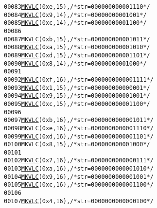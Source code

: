 \begin{footnotesize}
\begin{alltt}
00083         \hyperlink{vlc_8h_aa680b26539d09b5954221ff39a127faa}{MKVLC}( 0xe, 15 ), \textcolor{comment}{/* str=000000000001110 */}
00084         \hyperlink{vlc_8h_aa680b26539d09b5954221ff39a127faa}{MKVLC}( 0x9, 14 ), \textcolor{comment}{/* str=00000000001001 */}
00085         \hyperlink{vlc_8h_aa680b26539d09b5954221ff39a127faa}{MKVLC}( 0xc, 14 ), \textcolor{comment}{/* str=00000000001100 */}
00086 
00087         \hyperlink{vlc_8h_aa680b26539d09b5954221ff39a127faa}{MKVLC}( 0xb, 15 ), \textcolor{comment}{/* str=000000000001011 */}
00088         \hyperlink{vlc_8h_aa680b26539d09b5954221ff39a127faa}{MKVLC}( 0xa, 15 ), \textcolor{comment}{/* str=000000000001010 */}
00089         \hyperlink{vlc_8h_aa680b26539d09b5954221ff39a127faa}{MKVLC}( 0xd, 15 ), \textcolor{comment}{/* str=000000000001101 */}
00090         \hyperlink{vlc_8h_aa680b26539d09b5954221ff39a127faa}{MKVLC}( 0x8, 14 ), \textcolor{comment}{/* str=00000000001000 */}
00091 
00092         \hyperlink{vlc_8h_aa680b26539d09b5954221ff39a127faa}{MKVLC}( 0xf, 16 ), \textcolor{comment}{/* str=0000000000001111 */}
00093         \hyperlink{vlc_8h_aa680b26539d09b5954221ff39a127faa}{MKVLC}( 0x1, 15 ), \textcolor{comment}{/* str=000000000000001 */}
00094         \hyperlink{vlc_8h_aa680b26539d09b5954221ff39a127faa}{MKVLC}( 0x9, 15 ), \textcolor{comment}{/* str=000000000001001 */}
00095         \hyperlink{vlc_8h_aa680b26539d09b5954221ff39a127faa}{MKVLC}( 0xc, 15 ), \textcolor{comment}{/* str=000000000001100 */}
00096 
00097         \hyperlink{vlc_8h_aa680b26539d09b5954221ff39a127faa}{MKVLC}( 0xb, 16 ), \textcolor{comment}{/* str=0000000000001011 */}
00098         \hyperlink{vlc_8h_aa680b26539d09b5954221ff39a127faa}{MKVLC}( 0xe, 16 ), \textcolor{comment}{/* str=0000000000001110 */}
00099         \hyperlink{vlc_8h_aa680b26539d09b5954221ff39a127faa}{MKVLC}( 0xd, 16 ), \textcolor{comment}{/* str=0000000000001101 */}
00100         \hyperlink{vlc_8h_aa680b26539d09b5954221ff39a127faa}{MKVLC}( 0x8, 15 ), \textcolor{comment}{/* str=000000000001000 */}
00101 
00102         \hyperlink{vlc_8h_aa680b26539d09b5954221ff39a127faa}{MKVLC}( 0x7, 16 ), \textcolor{comment}{/* str=0000000000000111 */}
00103         \hyperlink{vlc_8h_aa680b26539d09b5954221ff39a127faa}{MKVLC}( 0xa, 16 ), \textcolor{comment}{/* str=0000000000001010 */}
00104         \hyperlink{vlc_8h_aa680b26539d09b5954221ff39a127faa}{MKVLC}( 0x9, 16 ), \textcolor{comment}{/* str=0000000000001001 */}
00105         \hyperlink{vlc_8h_aa680b26539d09b5954221ff39a127faa}{MKVLC}( 0xc, 16 ), \textcolor{comment}{/* str=0000000000001100 */}
00106 
00107         \hyperlink{vlc_8h_aa680b26539d09b5954221ff39a127faa}{MKVLC}( 0x4, 16 ), \textcolor{comment}{/* str=0000000000000100 */}

\end{alltt}
\end{footnotesize}
